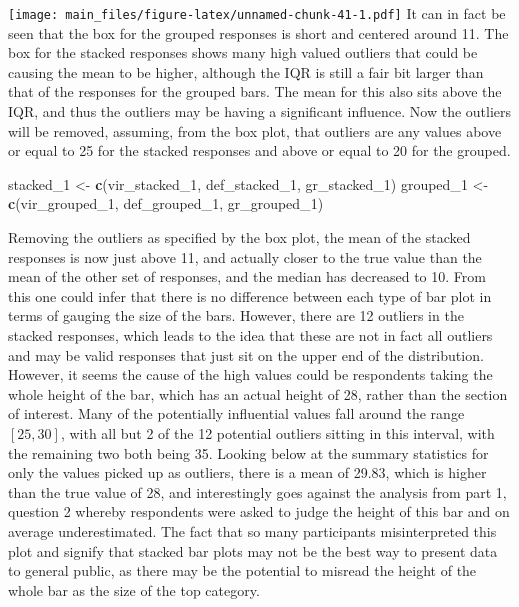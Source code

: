 \documentclass[
]{article}
\newenvironment{Shaded}{\begin{snugshade}}{\end{snugshade}}
\newcommand{\DecValTok}[1]{\textcolor[rgb]{0.00,0.00,0.81}{#1}}
\newcommand{\KeywordTok}[1]{\textcolor[rgb]{0.13,0.29,0.53}{\textbf{#1}}}
\newcommand{\NormalTok}[1]{#1}
\newcommand{\StringTok}[1]{\textcolor[rgb]{0.31,0.60,0.02}{#1}}
\begin{document}
\texttt{[image: main\_files/figure-latex/unnamed-chunk-41-1.pdf]} It can
in fact be seen that the box for the grouped responses is short and
centered around 11. The box for the stacked responses shows many high
valued outliers that could be causing the mean to be higher, although
the IQR is still a fair bit larger than that of the responses for the
grouped bars. The mean for this also sits above the IQR, and thus the
outliers may be having a significant influence. Now the outliers will be
removed, assuming, from the box plot, that outliers are any values above
or equal to 25 for the stacked responses and above or equal to 20 for
the grouped.

\begin{Shaded}
\begin{Highlighting}[]
\NormalTok{stacked_}\DecValTok{1}\NormalTok{ <-}\StringTok{ }\KeywordTok{c}\NormalTok{(vir_stacked_}\DecValTok{1}\NormalTok{, def_stacked_}\DecValTok{1}\NormalTok{, gr_stacked_}\DecValTok{1}\NormalTok{)}
\NormalTok{grouped_}\DecValTok{1}\NormalTok{ <-}\StringTok{ }\KeywordTok{c}\NormalTok{(vir_grouped_}\DecValTok{1}\NormalTok{, def_grouped_}\DecValTok{1}\NormalTok{, gr_grouped_}\DecValTok{1}\NormalTok{)}
\end{Highlighting}
\end{Shaded}

Removing the outliers as specified by the box plot, the mean of the
stacked responses is now just above 11, and actually closer to the true
value than the mean of the other set of responses, and the median has
decreased to 10. From this one could infer that there is no difference
between each type of bar plot in terms of gauging the size of the bars.
However, there are 12 outliers in the stacked responses, which leads to
the idea that these are not in fact all outliers and may be valid
responses that just sit on the upper end of the distribution. However,
it seems the cause of the high values could be respondents taking the
whole height of the bar, which has an actual height of 28, rather than
the section of interest. Many of the potentially influential values fall
around the range \([25, 30]\), with all but 2 of the 12 potential
outliers sitting in this interval, with the remaining two both being 35.
Looking below at the summary statistics for only the values picked up as
outliers, there is a mean of 29.83, which is higher than the true value
of 28, and interestingly goes against the analysis from part 1, question
2 whereby respondents were asked to judge the height of this bar and on
average underestimated. The fact that so many participants
misinterpreted this plot and signify that stacked bar plots may not be
the best way to present data to general public, as there may be the
potential to misread the height of the whole bar as the size of the top
category.
\end{document}
